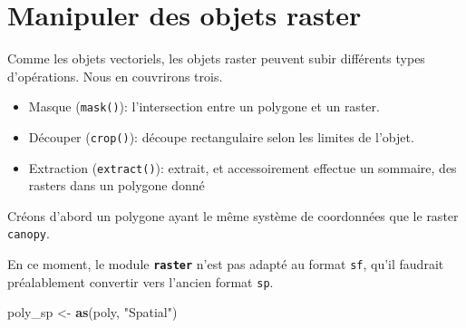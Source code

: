 \documentclass[]{book}
\newenvironment{Shaded}{\begin{snugshade}}{\end{snugshade}}
\newcommand{\DecValTok}[1]{\textcolor[rgb]{0.00,0.00,0.81}{#1}}
\newcommand{\KeywordTok}[1]{\textcolor[rgb]{0.13,0.29,0.53}{\textbf{#1}}}
\newcommand{\NormalTok}[1]{#1}
\newcommand{\OperatorTok}[1]{\textcolor[rgb]{0.81,0.36,0.00}{\textbf{#1}}}
\newcommand{\StringTok}[1]{\textcolor[rgb]{0.31,0.60,0.02}{#1}}
\providecommand{\tightlist}{%
  \setlength{\itemsep}{0pt}\setlength{\parskip}{0pt}}
\begin{document}
\hypertarget{manipuler-des-objets-raster}{%
\section{Manipuler des objets
raster}\label{manipuler-des-objets-raster}}

Comme les objets vectoriels, les objets raster peuvent subir différents
types d'opérations. Nous en couvrirons trois.

\begin{itemize}
\tightlist
\item
  Masque (\texttt{mask()}): l'intersection entre un polygone et un
  raster.
\item
  Découper (\texttt{crop()}): découpe rectangulaire selon les limites de
  l'objet.
\item
  Extraction (\texttt{extract()}): extrait, et accessoirement effectue
  un sommaire, des rasters dans un polygone donné
\end{itemize}

Créons d'abord un polygone ayant le même système de coordonnées que le
raster \texttt{canopy}.

\begin{Shaded}
\end{Shaded}

En ce moment, le module \textbf{\texttt{raster}} n'est pas adapté au
format \texttt{sf}, qu'il faudrait préalablement convertir vers l'ancien
format \texttt{sp}.

\begin{Shaded}
\begin{Highlighting}[]
\NormalTok{poly_sp <-}\StringTok{ }\KeywordTok{as}\NormalTok{(poly, }\StringTok{"Spatial"}\NormalTok{)}
\end{Highlighting}
\end{Shaded}
\end{document}
